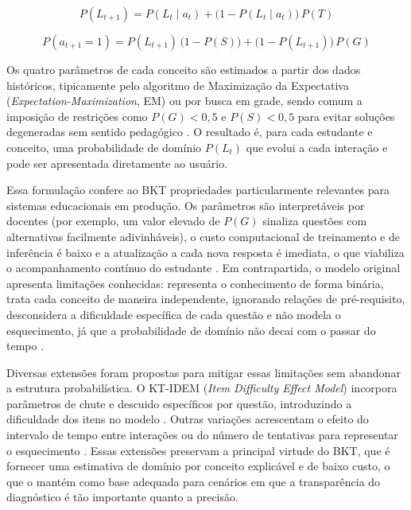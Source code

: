 \begin{equation}
\label{eq:bkt-transicao}
P(L_{t+1}) = P(L_t \mid a_t) + \bigl(1 - P(L_t \mid a_t)\bigr)\,P(T)
\end{equation}

\begin{equation}
\label{eq:bkt-predicao}
P(a_{t+1} = 1) = P(L_{t+1})\,\bigl(1 - P(S)\bigr) + \bigl(1 - P(L_{t+1})\bigr)\,P(G)
\end{equation}

Os quatro parâmetros de cada conceito são estimados a partir dos dados históricos, tipicamente pelo algoritmo de Maximização da Expectativa (\textit{Expectation-Maximization}, EM) ou por busca em grade, sendo comum a imposição de restrições como $P(G) < 0{,}5$ e $P(S) < 0{,}5$ para evitar soluções degeneradas sem sentido pedagógico \cite{pelanek_bayesian_2017}. O resultado é, para cada estudante e conceito, uma probabilidade de domínio $P(L_t)$ que evolui a cada interação e pode ser apresentada diretamente ao usuário.

Essa formulação confere ao BKT propriedades particularmente relevantes para sistemas educacionais em produção. Os parâmetros são interpretáveis por docentes (por exemplo, um valor elevado de $P(G)$ sinaliza questões com alternativas facilmente adivinháveis), o custo computacional de treinamento e de inferência é baixo e a atualização a cada nova resposta é imediata, o que viabiliza o acompanhamento contínuo do estudante \cite{corbett_knowledge_1994, pelanek_bayesian_2017}. Em contrapartida, o modelo original apresenta limitações conhecidas: representa o conhecimento de forma binária, trata cada conceito de maneira independente, ignorando relações de pré-requisito, desconsidera a dificuldade específica de cada questão e não modela o esquecimento, já que a probabilidade de domínio não decai com o passar do tempo \cite{nagatani_augmenting_2019, cui_rebalancing_2025}.

Diversas extensões foram propostas para mitigar essas limitações sem abandonar a estrutura probabilística. O KT-IDEM (\textit{Item Difficulty Effect Model}) incorpora parâmetros de chute e descuido específicos por questão, introduzindo a dificuldade dos itens no modelo \cite{pardos_kt-idem_2011}. Outras variações acrescentam o efeito do intervalo de tempo entre interações ou do número de tentativas para representar o esquecimento \cite{nagatani_augmenting_2019}. Essas extensões preservam a principal virtude do BKT, que é fornecer uma estimativa de domínio por conceito explicável e de baixo custo, o que o mantém como base adequada para cenários em que a transparência do diagnóstico é tão importante quanto a precisão.

